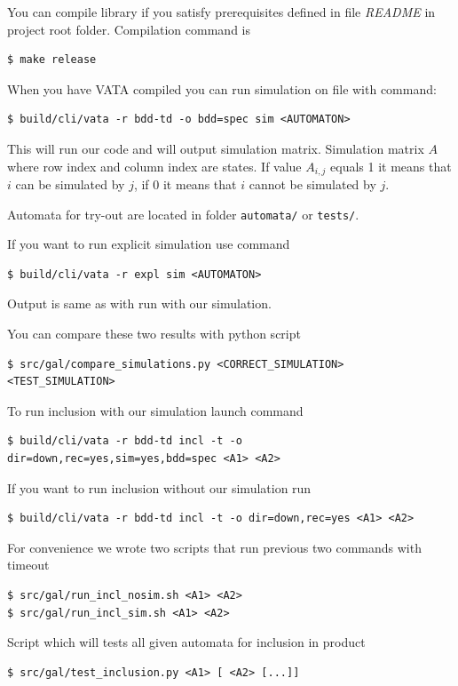 \documentclass[a4paper, 12pt]{article}
\begin{document}
You can compile library if you satisfy prerequisites defined in file \textit{README} in project root folder. Compilation command is
\begin{verbatim}
$ make release
\end{verbatim}

When you have VATA compiled you can run simulation on file with command:
\begin{verbatim}
$ build/cli/vata -r bdd-td -o bdd=spec sim <AUTOMATON>
\end{verbatim}
This will run our code and will output simulation matrix. Simulation matrix $A$ where row index and column index are states. If value $A_{i,j}$ equals 1 it means that $i$ can be simulated by $j$, if 0 it means that $i$ cannot be simulated by $j$.

Automata for try-out are located in folder \texttt{automata/} or \texttt{tests/}.

If you want to run explicit simulation use command
\begin{verbatim}
$ build/cli/vata -r expl sim <AUTOMATON>
\end{verbatim}
Output is same as with run with our simulation.

You can compare these two results with python script
\begin{verbatim}
$ src/gal/compare_simulations.py <CORRECT_SIMULATION> <TEST_SIMULATION>
\end{verbatim}

To run inclusion with our simulation launch command
\begin{verbatim}
$ build/cli/vata -r bdd-td incl -t -o dir=down,rec=yes,sim=yes,bdd=spec <A1> <A2>
\end{verbatim}

If you want to run inclusion without our simulation run
\begin{verbatim}
$ build/cli/vata -r bdd-td incl -t -o dir=down,rec=yes <A1> <A2>
\end{verbatim}

For convenience we wrote two scripts that run previous two commands with timeout
\begin{verbatim}
$ src/gal/run_incl_nosim.sh <A1> <A2> 
$ src/gal/run_incl_sim.sh <A1> <A2>
\end{verbatim}

Script which will tests all given automata for inclusion in product
\begin{verbatim}
$ src/gal/test_inclusion.py <A1> [ <A2> [...]]
\end{verbatim}

\newpage
 


\end{document}
